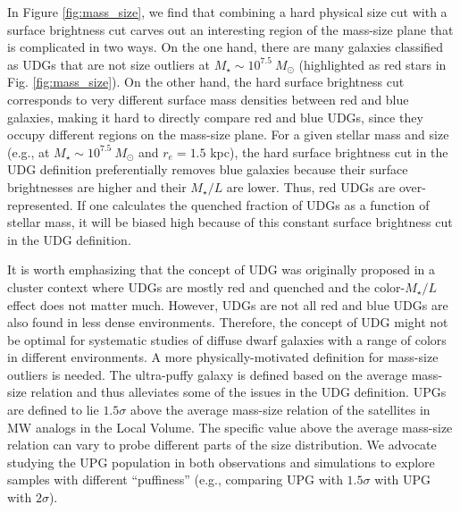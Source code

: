 \documentclass[twocolumn,astrosymb,twocolappendix]{aastex631}
\begin{document}
\begin{CJK*}{UTF8}{gbsn}
In Figure \ref{fig:mass_size}, we find that combining a hard physical size cut with a surface brightness cut carves out an interesting region of the mass-size plane that is complicated in two ways. On the one hand, there are many galaxies classified as UDGs that are not size outliers at $M_\star \sim 10^{7.5}\ M_\odot$ (highlighted as red stars in Fig. \ref{fig:mass_size}). On the other hand, the hard surface brightness cut corresponds to very different surface mass densities between red and blue galaxies, making it hard to directly compare red and blue UDGs, since they occupy different regions on the mass-size plane. For a given stellar mass and size (e.g., at $M_\star \sim 10^{7.5}\ M_\odot$ and $r_e = 1.5$ kpc), the hard surface brightness cut in the UDG definition preferentially removes blue galaxies because their surface brightnesses are higher and their $M_\star/L$ are lower. Thus, red UDGs are over-represented. If one calculates the quenched fraction of UDGs as a function of stellar mass, it will be biased high because of this constant surface brightness cut in the UDG definition.

It is worth emphasizing that the concept of UDG was originally proposed in a cluster context where UDGs are mostly red and quenched \citep[e.g.,][]{vanDokkum2015} and the color-$M_\star/L$ effect does not matter much. However, UDGs are not all red and blue UDGs are also found in less dense environments. Therefore, the concept of UDG might not be optimal for systematic studies of diffuse dwarf galaxies with a range of colors in different environments. A more physically-motivated definition for mass-size outliers is needed. The ultra-puffy galaxy is defined based on the average mass-size relation and thus alleviates some of the issues in the UDG definition. UPGs are defined to lie $1.5\sigma$ above the average mass-size relation of the satellites in MW analogs in the Local Volume. The specific value above the average mass-size relation can vary to probe different parts of the size distribution. We advocate studying the UPG population in both observations and simulations to explore samples with different ``puffiness'' (e.g., comparing UPG with $1.5\sigma$ with UPG with $2\sigma$). 



\end{CJK*}
\end{document}
